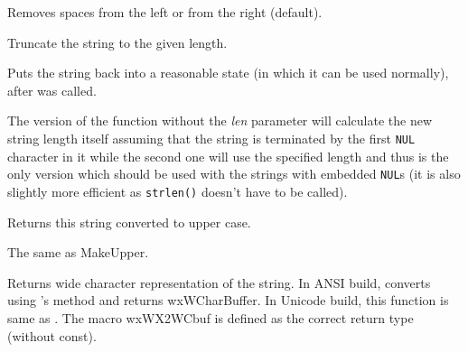 
Removes spaces from the left or from the right (default).

\label{wxstringtruncate}


Truncate the string to the given length.

\label{wxstringungetwritebuf}



Puts the string back into a reasonable state (in which it can be used
normally), after
\rtfsp{} was called.

The version of the function without the {\it len} parameter will calculate the
new string length itself assuming that the string is terminated by the first
{\tt NUL} character in it while the second one will use the specified length
and thus is the only version which should be used with the strings with
embedded {\tt NUL}s (it is also slightly more efficient as {\tt strlen()} 
doesn't have to be called).

\label{wxstringupper}


Returns this string converted to upper case.

\label{wxstringuppercase}


The same as MakeUpper.

\label{wxstringwcstr}



Returns wide character representation of the string.
In ANSI build, converts using 's 
method and returns wxWCharBuffer. In Unicode build, this function is same
as .
The macro wxWX2WCbuf is defined as the correct return type (without const).


